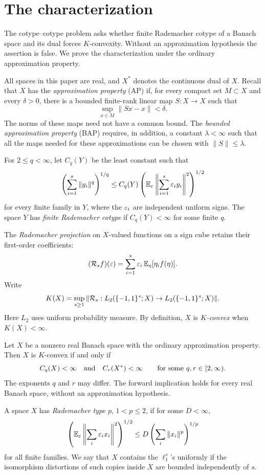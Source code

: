 \section{The characterization}\label{sec:introduction}

The cotype--cotype problem asks whether finite Rademacher cotype
of a Banach space and its dual forces \(K\)-convexity. Without an
approximation hypothesis the assertion is false. We prove the characterization under the
ordinary approximation property.

All spaces in this paper are real, and \(X^*\) denotes the continuous
dual of \(X\). Recall that \(X\) has the \emph{approximation property}
(AP) if, for every compact set \(M\subset X\) and every \(\delta>0\),
there is a bounded finite-rank linear map \(S:X\to X\) such that
\[
\sup_{x\in M}\|Sx-x\|<\delta.
\]
The norms of these maps need not have a common bound. The
\emph{bounded approximation property} (BAP) requires, in addition,
a constant \(\lambda<\infty\) such that all the maps needed for these
approximations can be chosen with \(\|S\|\le\lambda\).

For \(2\le q<\infty\), let \(C_q(Y)\) be the least constant such that
\[
\left(\sum_{i=1}^s\|y_i\|^q\right)^{1/q}
\le C_q(Y)
\left(\mathbb E_\varepsilon\left\|\sum_{i=1}^s\varepsilon_i y_i\right\|^2\right)^{1/2}
\]
for every finite family in \(Y\), where the \(\varepsilon_i\) are independent
uniform signs. The space \(Y\) has \emph{finite Rademacher cotype} if
\(C_q(Y)<\infty\) for some finite \(q\).

The \emph{Rademacher projection} on \(X\)-valued functions on a sign
cube retains their first-order coefficients:
\[
(\mathcal R_s f)(\varepsilon)=\sum_{i=1}^s\varepsilon_i\,\mathbb E_\eta[\eta_i f(\eta)].
\]
Write
\[
K(X)=\sup_{s\ge1}
\|\mathcal R_s:L_2(\{-1,1\}^s;X)\to L_2(\{-1,1\}^s;X)\|.
\]
Here \(L_2\) uses uniform probability measure. By definition, \(X\) is
\emph{\(K\)-convex} when \(K(X)<\infty\).

\begin{theorem}\label{thm:main}
Let \(X\) be a nonzero real Banach space with the ordinary approximation
property. Then \(X\) is \(K\)-convex if and only if
\[
C_q(X)<\infty
\quad\hbox{and}\quad
C_r(X^*)<\infty
\qquad\text{for some }q,r\in[2,\infty).
\]
The exponents \(q\) and \(r\) may differ. The forward implication holds
for every real Banach space, without an approximation hypothesis.
\end{theorem}

A space \(X\) has \emph{Rademacher type \(p\)}, \(1<p\le2\), if for some \(D<\infty\),
\[
\left(\mathbb E_\varepsilon\left\|\sum_i\varepsilon_i x_i\right\|^2\right)^{1/2}
\le D\left(\sum_i\|x_i\|^p\right)^{1/p}
\]
for all finite families. We say that \(X\) contains the \(\ell_1^s\)'s
uniformly if the isomorphism distortions of such copies inside \(X\)
are bounded independently of \(s\).


